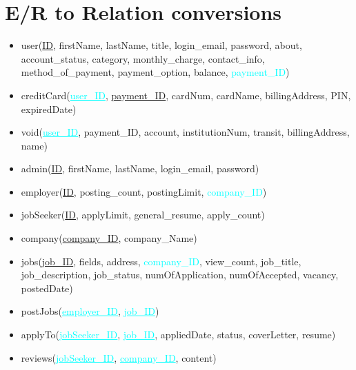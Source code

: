 \newpage
\section{E/R to Relation conversions}

\begin{itemize}
    \item user(\underline{ID}, firstName, lastName, title, login\_email, password, about, account\_status, category, monthly\_charge, contact\_info, method\_of\_payment, payment\_option, balance, \textcolor{cyan}{payment\_ID})
    \item creditCard(\textcolor{cyan}{\underline{user\_ID}}, \underline{payment\_ID}, cardNum, cardName, billingAddress, PIN, expiredDate)
    \item void(\textcolor{cyan}{\underline{user\_ID}}, payment\_ID, account, institutionNum, transit, billingAddress, name)
    \item admin(\underline{ID}, firstName, lastName, login\_email, password)
    \item employer(\underline{ID}, posting\_count, postingLimit, \textcolor{cyan}{company\_ID})
    \item jobSeeker(\underline{ID}, applyLimit, general\_resume, apply\_count)
    \item company(\underline{company\_ID}, company\_Name)
    \item jobs(\underline{job\_ID}, fields, address, \textcolor{cyan}{company\_ID}, view\_count, job\_title, job\_description, job\_status, numOfApplication, numOfAccepted, vacancy, postedDate) 
    \item postJobs(\textcolor{cyan}{\underline{employer\_ID}}, \textcolor{cyan}{\underline{job\_ID}})
    \item applyTo(\textcolor{cyan}{\underline{jobSeeker\_ID}}, \textcolor{cyan}{\underline{job\_ID}}, appliedDate, status, coverLetter, resume)
    \item reviews(\textcolor{cyan}{\underline{jobSeeker\_ID}}, \textcolor{cyan}{\underline{company\_ID}}, content)
\end{itemize}

